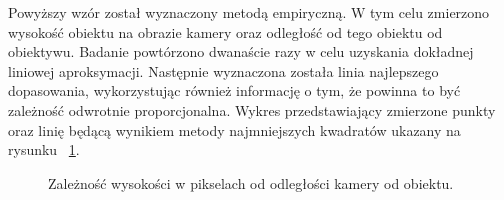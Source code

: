 Powyższy wzór został wyznaczony metodą empiryczną. W tym celu zmierzono wysokość obiektu na obrazie kamery oraz odległość od tego obiektu od obiektywu. Badanie powtórzono dwanaście razy w celu uzyskania dokładnej liniowej aproksymacji. Następnie wyznaczona została linia najlepszego dopasowania, wykorzystując również informację o tym, że powinna to być zależność odwrotnie proporcjonalna. Wykres przedstawiający zmierzone punkty oraz linię będącą wynikiem metody najmniejszych kwadratów ukazany na rysunku ~\ref{fig:wysokoscOdleglosc}.
\begin{figure}[H]
  \centering
    

  \caption{Zależność wysokości w pikselach od odległości kamery od obiektu.}   
  \label{fig:wysokoscOdleglosc}
\end{figure}
